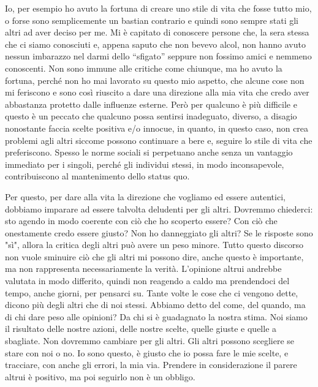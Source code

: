 \documentclass[12pt]{book} %
\begin{document}
Io, per esempio ho avuto la fortuna di creare uno stile di vita che fosse tutto mio, o forse sono semplicemente un
bastian contrario e quindi sono sempre stati gli altri ad aver deciso per me. Mi è capitato di conoscere persone che, la sera
stessa che ci siamo conosciuti e, appena saputo che non bevevo alcol, non hanno avuto nessun imbarazzo nel darmi dello
“sfigato” seppure non fossimo amici e nemmeno conoscenti. Non sono immune alle critiche come chiunque, ma ho avuto la
fortuna, perché non ho mai lavorato su questo mio aspetto, che alcune cose non mi feriscono e sono così riuscito a dare
una direzione alla mia vita che credo aver abbastanza protetto dalle influenze esterne. Però per qualcuno è più
difficile e questo è un peccato che qualcuno possa sentirsi inadeguato, diverso, a disagio nonostante faccia scelte
positiva e/o innocue, in quanto, in questo caso, non crea problemi agli altri siccome possono continuare a bere e,
seguire lo stile di vita che preferiscono. Spesso le norme sociali si perpetuano anche senza un vantaggio immediato per i singoli, perché gli individui stessi, in modo inconsapevole, contribuiscono al mantenimento dello status quo. 

Per questo, per dare alla vita la direzione che vogliamo ed essere autentici, dobbiamo imparare ad essere talvolta
deludenti per gli altri.
Dovremmo chiederci: sto agendo in modo coerente con ciò che ho scoperto essere? Con ciò che onestamente credo essere giusto? Non ho danneggiato gli altri? Se le risposte sono "sì", allora la critica degli altri può avere un peso minore. Tutto questo discorso non vuole sminuire ciò che gli altri mi possono dire, anche questo è importante, ma non rappresenta necessariamente la verità.
L'opinione altrui andrebbe valutata in modo differito, quindi non reagendo a caldo ma prendendoci del tempo, anche giorni, per pensarci su. Tante volte le cose che ci vengono dette, dicono più degli altri che di noi stessi.
Abbiamo detto del come, del quando, ma di chi dare peso alle opinioni? Da chi si è guadagnato la nostra stima.
Noi siamo il risultato delle nostre azioni, delle nostre scelte, quelle giuste e quelle a sbagliate. Non dovremmo cambiare per gli altri. Gli altri possono scegliere se stare con noi o no. Io sono questo, è giusto che io possa fare le mie scelte, e tracciare, con anche gli errori, la mia via.
Prendere in considerazione il parere altrui è positivo, ma poi seguirlo non è un obbligo. 
\end{document}
